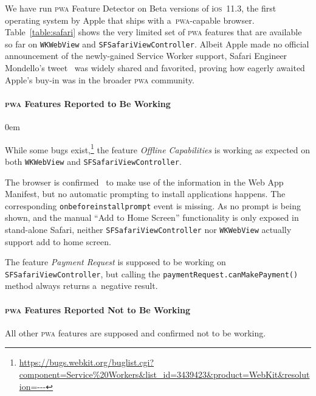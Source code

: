 \documentclass[sigconf]{acmart}
\begin{document}
We have run \textsc{pwa} Feature Detector on Beta versions of i\textsc{os}~11.3,
the first operating system by Apple that ships with a~\textsc{pwa}-capable browser.
Table~\ref{table:safari} shows the very limited set of \textsc{pwa} features
that are available so far on \texttt{WKWebView} and \texttt{SFSafariViewController}.
Albeit Apple made no official announcement of the newly-gained Service Worker support,
Safari Engineer Mondello's tweet~\cite{mondello2018safari} was widely shared and favorited,
proving how eagerly awaited Apple's buy-in was in the broader \textsc{pwa} community.

\paragraph{\textsc{pwa} Features Reported to Be Working}

\begin{description}
  \itemsep0em 
  \item[Offline Capabilities] While some bugs
    exist,\footnote{\url{https://bugs.webkit.org/buglist.cgi?component=Service\%20Workers&list_id=3439423&product=WebKit&resolution=---}} the feature \emph{Offline Capabilities}
    is working as expected on both \texttt{WKWebView} and \texttt{SFSafariViewController}.
  \item[Add to Home Screen] The browser is confirmed~\cite{mondello2018safari}
    to make use of the information in the Web App Manifest,
    but no automatic prompting to install applications happens.
    The corresponding \texttt{onbeforeinstallprompt} event is missing.
    As no prompt is being shown, and the manual ``Add to Home Screen'' functionality
    is only exposed in stand-alone Safari, neither \texttt{SFSafariViewController} nor \texttt{WKWebView}
    actually support add to home screen.
  \item[Payment Request] The feature \emph{Payment Request} is supposed
    to be working on \texttt{SFSafariViewController}, but calling the \texttt{paymentRequest.canMakePayment()}
    method always returns a~negative result.
\end{description} 

\paragraph{\textsc{pwa} Features Reported Not to Be Working}

All other \textsc{pwa} features are supposed and confirmed not to be working.
\end{document}
